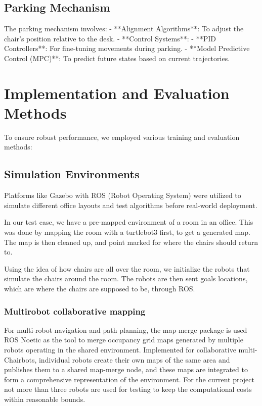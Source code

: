 \documentclass[a4paper,twocolumn]{article}
\begin{document}
\subsection{Parking Mechanism}
The parking mechanism involves:
- **Alignment Algorithms**: To adjust the chair's position relative to the desk.
- **Control Systems**:
    - **PID Controllers**: For fine-tuning movements during parking.
    - **Model Predictive Control (MPC)**: To predict future states based on current trajectories.

\section{Implementation and Evaluation Methods}
To ensure robust performance, we employed various training and evaluation methods:

\subsection{Simulation Environments}
Platforms like Gazebo with ROS (Robot Operating System) were utilized to simulate different office layouts and test algorithms before real-world deployment.

In our test case, we have a pre-mapped environment of a room in an office. This was done by mapping the room with a turtlebot3 first, to get a generated map. The map is then cleaned up, and point marked for where the chairs should return to.

Using the idea of how chairs are all over the room, we initialize the robots that simulate the chairs around the room. The robots are then sent goals locations, which are where the chairs are supposed to be, through ROS.

\subsubsection{Multirobot collaborative mapping}

For multi-robot navigation and path planning, the map-merge package is used ROS Noetic as the tool to merge occupancy grid maps generated by multiple robots operating in the shared environment. Implemented for collaborative multi-Chairbots, individual robots create their own maps of the same area and publishes them to a shared map-merge node, and these maps are integrated to form a comprehensive representation of the environment. For the current project not more than three robots are used for testing to keep the computational costs within reasonable bounds.
\end{document}
